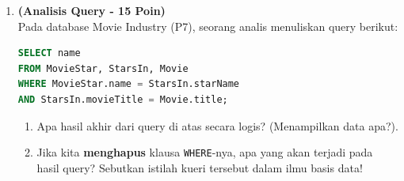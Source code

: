 \documentclass[11pt,a4paper]{article}
\begin{document}
\begin{enumerate}[start=7]
	\item \textbf{(Analisis Query - 15 Poin)}\\
	      Pada database Movie Industry (P7), seorang analis menuliskan query berikut:
	      \begin{lstlisting}[language=SQL]
SELECT name
FROM MovieStar, StarsIn, Movie
WHERE MovieStar.name = StarsIn.starName
AND StarsIn.movieTitle = Movie.title;
	\end{lstlisting}
	      \begin{enumerate}[label=\alph*.]
		      \item Apa hasil akhir dari query di atas secara logis? (Menampilkan data apa?).
		      \item Jika kita \textbf{menghapus} klausa \texttt{WHERE}-nya, apa yang akan terjadi pada hasil query? Sebutkan istilah kueri tersebut dalam ilmu basis data!
	      \end{enumerate}
\end{enumerate}
\end{document}
